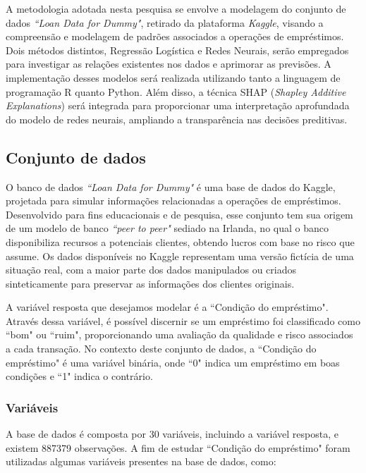 A metodologia adotada nesta pesquisa se envolve a modelagem do conjunto de dados \textit{``Loan Data for Dummy"},
retirado da plataforma \textit{Kaggle},
visando a compreensão e modelagem de padrões associados a operações de empréstimos. Dois métodos distintos, 
Regressão Logística e Redes Neurais, serão empregados para investigar as relações existentes nos dados e aprimorar as previsões.
A implementação desses modelos será realizada utilizando tanto a linguagem de programação R quanto Python.
Além disso, a técnica SHAP (\textit{Shapley Additive Explanations}) será integrada para proporcionar
uma interpretação aprofundada do modelo de redes neurais, ampliando a transparência nas decisões preditivas. 



\subsection{Conjunto de dados}

O banco de dados \textit{``Loan Data for Dummy"} é uma base de dados do Kaggle, projetada para simular informações relacionadas 
a operações de empréstimos. Desenvolvido para fins educacionais e de pesquisa, esse conjunto tem sua origem de um modelo de 
banco \textit{``peer to peer"} sediado na Irlanda, no qual o banco disponibiliza recursos a potenciais clientes, 
obtendo lucros com base no risco que assume. 
Os dados disponíveis no Kaggle representam uma versão fictícia de uma situação real, com a maior parte dos dados manipulados
ou criados sinteticamente para preservar as informações dos clientes originais.

A variável resposta que desejamos modelar é a ``Condição do empréstimo". Através dessa variável, é 
possível discernir se um empréstimo foi classificado como ``bom" ou ``ruim", proporcionando uma avaliação da qualidade e 
risco associados a cada transação. No contexto deste conjunto de dados, a ``Condição do empréstimo" é uma variável binária,
onde ``0" indica um empréstimo em boas condições e ``1" indica o contrário.

\subsubsection{Variáveis}

A base de dados é composta por 30 variáveis, incluindo a variável resposta, e existem 887379 observações.
A fim de estudar ``Condição do empréstimo" foram utilizadas algumas variáveis presentes na base de dados, como:

